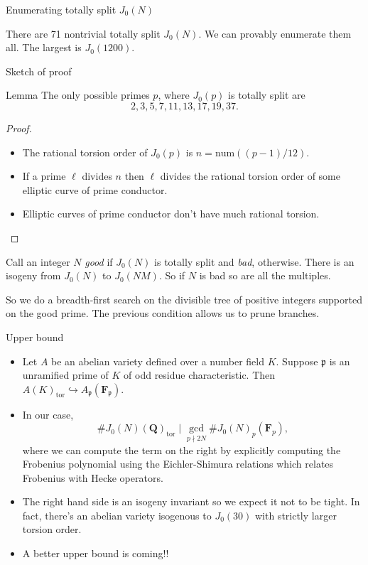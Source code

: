 \documentclass{beamer}
\newcommand{\QQ}{\mathbf{Q}}
\newcommand{\FF}{\mathbf{F}}
\newcommand{\tor}{\mathrm{tor}}
\newcommand{\num}{\mathrm{num}}
\newcommand{\p}{\mathfrak{p}}
\begin{document}
\begin{frame}{Enumerating totally split $J_0(N)$}
    \begin{theorem}[L.]
        There are 71 nontrivial totally split $J_0(N)$. We can provably
        enumerate them all. The largest is $J_0(1200)$.
    \end{theorem}
\end{frame}

\begin{frame}{Sketch of proof}
    \begin{block}{Lemma}
    The only possible primes $p$, where $J_0(p)$ is totally split are
    \[
        2, 3, 5, 7, 11, 13, 17, 19, 37.
    \]
    \end{block}
    \begin{proof}
        \begin{itemize}
            \item 
                The rational torsion order of $J_0(p)$ is $n=\num((p-1)/12)$.
            \item
                If a prime $\ell$ divides $n$ then $\ell$ divides the rational
                torsion order of some elliptic curve of prime conductor.
            \item
                Elliptic curves of prime conductor don't have much rational
                torsion.
        \end{itemize}
   \end{proof}
    Call an integer $N$ \emph{good} if $J_0(N)$ is totally split and
    \emph{bad}, otherwise. There is an isogeny from $J_0(N)$ to $J_0(NM)$. So
    if $N$ is bad so are all the multiples.

    So we do a breadth-first search on the divisible tree of positive integers
    supported on the good prime. The previous condition allows us to prune
    branches.
\end{frame}


\begin{frame}{Upper bound}
    \begin{itemize}
        \item 
            Let $A$ be an abelian variety defined over a number field $K$.
            Suppose $\p$ is an unramified prime of $K$ of odd residue
            characteristic. Then $A(K)_\tor \hookrightarrow A_\p(\FF_\p)$.
        \item
            In our case,
            \[
                \#J_0(N)(\QQ)_\tor \mid  \gcd_{p\nmid 2N} \#J_0(N)_p (\FF_p),
            \]
            where we can compute the term on the right by explicitly computing
            the Frobenius polynomial using the Eichler-Shimura relations which
            relates Frobenius with Hecke operators.
        \item
            The right hand side is an isogeny invariant so we expect it not to
            be tight. In fact, there's an abelian variety isogenous to
            $J_0(30)$ with strictly larger torsion order.
        \item
            A better upper bound is coming!!
    \end{itemize} 
\end{frame}
\end{document}
